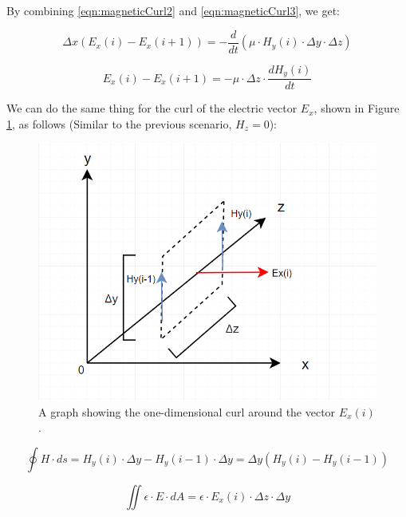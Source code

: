By combining \ref{eqn:magneticCurl2} and \ref{eqn:magneticCurl3}, we get:

\begin{equation}
	\label{eqn:magneticCurl4}
	\Delta x(E_x(i) - E_x(i+1)) = -\frac{d}{dt} (\mu \cdot H_y(i) \cdot \Delta y \cdot \Delta z)
\end{equation}

\begin{equation}
	\label{eqn:magneticCurl5}
	E_x(i) - E_x(i+1) = -\mu \cdot \Delta z \cdot \frac{dH_y(i)}{dt}
\end{equation}

We can do the same thing for the curl of the electric vector $E_x$, shown in Figure \ref{fig:fdtd1dEcurl}, as follows (Similar to the previous scenario, $H_z = 0$):

\begin{figure}
	\centering
	\includegraphics[scale=0.7]{Figures/fdtd1dEcurl}
	\decoRule
	\caption[1D Curl around $E_x$]{A graph showing the one-dimensional curl around the vector $E_x(i)$.}
	\label{fig:fdtd1dEcurl}
\end{figure}

\begin{equation}
	\label{eqn:electricCurl1}
	\oint H \cdot ds = H_y(i) \cdot \Delta y - H_y(i-1) \cdot \Delta y = \Delta y (H_y(i) - H_y(i-1))
\end{equation}

\begin{equation}
	\label{eqn:electricCurl2}
	\iint \epsilon \cdot E \cdot dA = \epsilon \cdot E_x(i) \cdot \Delta z \cdot \Delta y
\end{equation}

